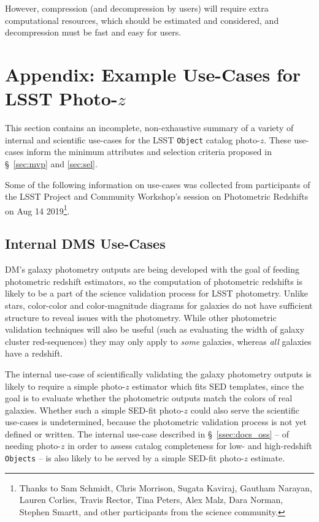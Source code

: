 \documentclass[DM,lsstdraft,toc]{lsstdoc}
\begin{document}
However, compression (and decompression by users) will require extra computational resources, which should be estimated and considered, and decompression must be fast and easy for users.


\clearpage
\section{Appendix: Example Use-Cases for LSST Photo-$z$} \label{sec:use}

This section contains an incomplete, non-exhaustive summary of a variety of internal and scientific use-cases for the LSST {\tt Object} catalog photo-$z$.
These use-cases inform the minimum attributes and selection criteria proposed in \S~\ref{sec:mvp} and \ref{sec:sel}. 

Some of the following information on use-cases was collected from participants of the LSST Project and Community Workshop's session on Photometric Redshifts on Aug 14 2019\footnote{Thanks to Sam Schmidt, Chris Morrison, Sugata Kaviraj, Gautham Narayan, Lauren Corlies, Travis Rector, Tina Peters, Alex Malz, Dara Norman, Stephen Smartt, and other participants from the science community.}.

\subsection{Internal DMS Use-Cases}\label{ssec:use_dm}

DM's galaxy photometry outputs are being developed with the goal of feeding photometric redshift estimators, so the computation of photometric redshifts is likely to be a part of the science validation process for LSST photometry. 
Unlike stars, color-color and color-magnitude diagrams for galaxies do not have sufficient structure to reveal issues with the photometry.
While other photometric validation techniques will also be useful (such as evaluating the width of galaxy cluster red-sequences) they may only apply to {\it some} galaxies, whereas {\it all} galaxies have a redshift. 

The internal use-case of scientifically validating the galaxy photometry outputs is likely to require a simple photo-$z$ estimator which fits SED templates, since the goal is to evaluate whether the photometric outputs match the colors of real galaxies.
Whether such a simple SED-fit photo-$z$ could also serve the scientific use-cases is undetermined, because the photometric validation process is not yet defined or written.
The internal use-case described in \S~\ref{ssec:docs_oss} -- of needing photo-$z$ in order to assess catalog completeness for low- and high-redshift {\tt Objects} -- is also likely to be served by a simple SED-fit photo-$z$ estimate.
\end{document}
